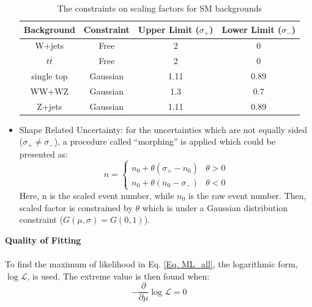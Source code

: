 \begin{itemize}
	\begin{table}[h]
		\caption{The constraints on scaling factors for SM backgrounds}
		\renewcommand{\arraystretch}{1.3}
		\centering
		\begin{tabular}{| c | c | c | c | }
			\hline
			\hline
			Background      &     Constraint     & Upper Limit ($\sigma_{+}$)  &  Lower Limit ($\sigma_{-}$)  \\
			\hline
			W+jets          &     Free           & 2                           &  0                          \\
			\hline
			$t\bar{t}$      &     Free           & 2                           &  0                          \\
			\hline
			single top      &     Gaussian       & 1.11                        &  0.89                       \\
			\hline
			WW+WZ           &     Gaussian       & 1.3                         &  0.7                        \\
			\hline
			Z+jets          &     Gaussian       & 1.11                        &  0.89                       \\
			\hline
		\end{tabular}
	\label{Tab:constaints}
    \end{table}

	\item Shape Related Uncertainty: for the uncertainties which are not equally sided ($\sigma_{+}\neq\sigma_{-}$), a procedure called ``morphing'' is applied which could be presented as:
    \begin{equation}
    n =
    \begin{cases}
    n_0+ \theta(\sigma_{+}-n_0) & \theta>0 \\
    n_0+ \theta(n_0-\sigma_{-}) & \theta<0
    \end{cases}
    \end{equation}
    Here, n is the scaled event number, while $n_0$ is the raw event number. Then, scaled factor is constrained by $\theta$ which is under a Gaussian distribution constraint ($G(\mu, \sigma)=G(0,1)$). 
\end{itemize}
\noindent
{\bf Quality of Fitting}
\\
\\To find the maximum of likelihood in Eq. \ref{Eq. ML_all}, the logarithmic form, $\log{\mathcal{L}}$, is used. The extreme value is then found when:
\begin{equation}
-\frac{\partial}{\partial\mu}\log{\mathcal{L}} = 0
\end{equation}
